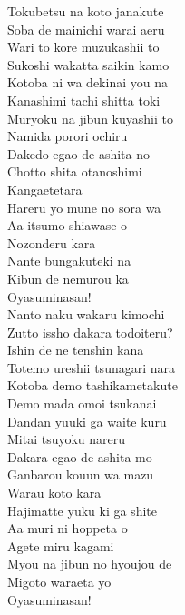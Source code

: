 \def\songtitle{Oyasuminasan!}
\def\songcomment{}
\def\songlyrics{Aki Hata}
\def\songwriter{Satoru Shirasuka \& Motoki Masuda}
\def\songarrange{Satoru Shirasuka \& Motoki Masuda}
   
\ifdefined\COMPLETE
\else
	
	
\fi
\thispagestyle{song}

\begin{multicols}{2}
Tokubetsu na koto janakute\\
Soba de mainichi warai aeru\\
Wari to kore muzukashii to\\
Sukoshi wakatta saikin kamo\\

Kotoba ni wa dekinai you na\\
Kanashimi tachi shitta toki\\
Muryoku na jibun kuyashii to\\
Namida porori ochiru\\

Dakedo egao de ashita no\\
Chotto shita otanoshimi\\
Kangaetetara\\
Hareru yo mune no sora wa\\
Aa itsumo shiawase o\\
Nozonderu kara\\
Nante bungakuteki na\\
Kibun de nemurou ka\\
Oyasuminasan!\\

Nanto naku wakaru kimochi\\
Zutto issho dakara todoiteru?\\
Ishin de ne tenshin kana\\
Totemo ureshii tsunagari nara\\

Kotoba demo tashikametakute\\
Demo mada omoi tsukanai\\
Dandan yuuki ga waite kuru\\
Mitai tsuyoku nareru\\

Dakara egao de ashita mo\\
Ganbarou kouun wa mazu\\
Warau koto kara\\
Hajimatte yuku ki ga shite\\
Aa muri ni hoppeta o\\
Agete miru kagami\\
Myou na jibun no hyoujou de\\
Migoto waraeta yo\\
Oyasuminasan!\\


\end{multicols}
